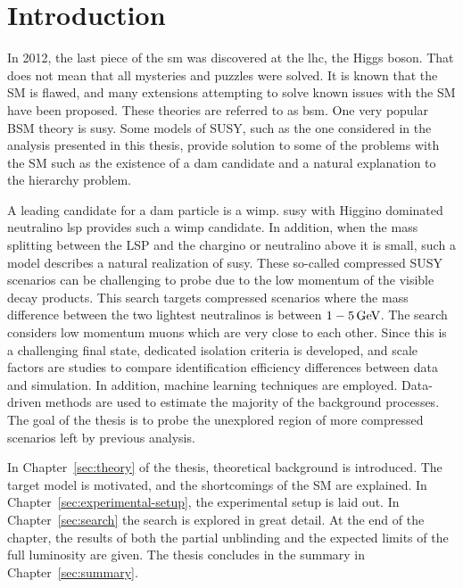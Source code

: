 \chapter{Introduction}

In 2012, the last piece of the \gls{sm} was discovered at the \gls{lhc}, the Higgs boson. That does not mean that all mysteries and puzzles were solved. It is known that the SM is flawed, and many extensions attempting to solve known issues with the SM have been proposed. These theories are referred to as \gls{bsm}. One very popular BSM theory is \gls{susy}. Some models of SUSY, such as the one considered in the analysis presented in this thesis, provide solution to some of the problems with the SM such as the existence of a \gls{dam} candidate and a natural explanation to the hierarchy problem.

A leading candidate for a \gls{dam} particle is a \gls{wimp}. \gls{susy} with Higgino dominated neutralino \gls{lsp} provides such a \gls{wimp} candidate. In addition, when the mass splitting between the LSP and the chargino or neutralino above it is small, such a model describes a natural realization of \gls{susy}. These so-called compressed SUSY scenarios can be challenging to probe due to the low momentum of the visible decay products. This search targets compressed scenarios where the mass difference between the two lightest neutralinos is between $1-5\,\text{Ge\hspace{-.08em}V}$. The search considers low momentum muons which are very close to each other. Since this is a challenging final state, dedicated isolation criteria is developed, and scale factors are studies to compare identification efficiency differences between data and simulation. In addition, machine learning techniques are employed. Data-driven methods are used to estimate the majority of the background processes. The goal of the thesis is to probe the unexplored region of more compressed scenarios left by previous analysis.

In Chapter~\ref{sec:theory} of the thesis, theoretical background is introduced. The target model is motivated, and the shortcomings of the SM are explained. In Chapter~\ref{sec:experimental-setup}, the experimental setup is laid out. In Chapter~\ref{sec:search} the search is explored in great detail. At the end of the chapter, the results of both the partial unblinding and the expected limits of the full luminosity are given. The thesis concludes in the summary in Chapter~\ref{sec:summary}.